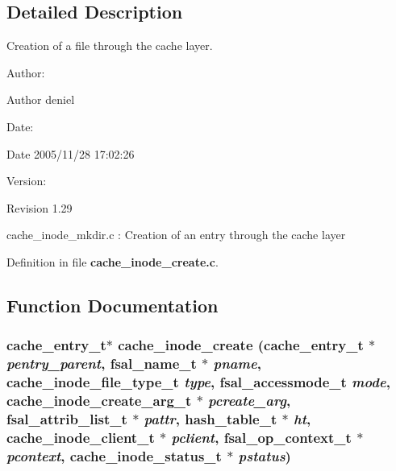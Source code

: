 \subsection{Detailed Description}
Creation of a file through the cache layer. 

\begin{Desc}
\item[Author:]\end{Desc}
\begin{Desc}
\item[Author]deniel \end{Desc}
\begin{Desc}
\item[Date:]\end{Desc}
\begin{Desc}
\item[Date]2005/11/28 17:02:26 \end{Desc}
\begin{Desc}
\item[Version:]\end{Desc}
\begin{Desc}
\item[Revision]1.29 \end{Desc}
cache\_\-inode\_\-mkdir.c : Creation of an entry through the cache layer 

Definition in file {\bf cache\_\-inode\_\-create.c}.

\subsection{Function Documentation}
\subsubsection[{cache\_\-inode\_\-create}]{\setlength{\rightskip}{0pt plus 5cm}cache\_\-entry\_\-t$\ast$ cache\_\-inode\_\-create (cache\_\-entry\_\-t $\ast$ {\em pentry\_\-parent}, \/  fsal\_\-name\_\-t $\ast$ {\em pname}, \/  cache\_\-inode\_\-file\_\-type\_\-t {\em type}, \/  fsal\_\-accessmode\_\-t {\em mode}, \/  cache\_\-inode\_\-create\_\-arg\_\-t $\ast$ {\em pcreate\_\-arg}, \/  fsal\_\-attrib\_\-list\_\-t $\ast$ {\em pattr}, \/  hash\_\-table\_\-t $\ast$ {\em ht}, \/  cache\_\-inode\_\-client\_\-t $\ast$ {\em pclient}, \/  fsal\_\-op\_\-context\_\-t $\ast$ {\em pcontext}, \/  cache\_\-inode\_\-status\_\-t $\ast$ {\em pstatus})}\label{cache__inode__create_8c_bfd4e6f4727782373fac879bfcf27384}


